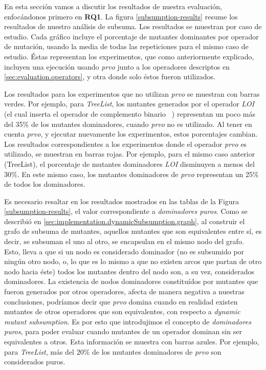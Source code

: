 En esta secci\'on vamos a discutir los resultados de nuestra evaluaci\'on, enfoc\'andonos primero en \textbf{RQ1}. La figura \ref{subsumption-results} resume los resultados de nuestro an\'alisis de subsuma. Los resultados se muestran por caso de estudio. Cada gr\'afico incluye el porcentaje de mutantes dominantes por operador de mutaci\'on, usando la media de todas las repeticiones para el mismo caso de estudio. \'Estas representan los experimentos, que como anteriormente explicado, incluyen una ejecuci\'on usando \emph{prvo} junto a los operadores descriptos en \ref{sec:evaluation.operators}, y otra donde solo \'estos fueron utilizados.

Los resultados para los experimentos que no utilizan \emph{prvo} se muestran con barras verdes. Por ejemplo, para \emph{TreeList}, los mutantes generados por el operador \emph{LOI} (el cual inserta el operador de complemento binario \emph{~}) representan un poco m\'as del 35\% de los mutantes dominadores, cuando \emph{prvo} no es utilizado. Al tener en cuenta \emph{prvo}, y ejecutar nuevamente los experimentos, estos porcentajes cambian. Los resultados correspondientes a los experimentos donde el operador \emph{prvo} es utilizado, se muestran en barras rojas. Por ejemplo, para el mismo caso anterior (TreeList), el porcentaje de mutantes dominadores \emph{LOI} disminuyen a menos del 30\%. En este mismo caso, los mutantes dominadores de \emph{prvo} representan un 25\% de todos los dominadores.

Es necesario resaltar en los resultados mostrados en las tablas de la Figura \ref{subsumption-results}, el valor correspondiente a \emph{dominadores puros}. Como se describi\'o en \ref{sec:implementation.dynamicSubsumption.graph}, al construir el grafo de subsuma de mutantes, aquellos mutantes que son equivalentes entre s\'i, es decir, se subsuman el uno al otro, se encapsulan en el mismo nodo del grafo. Esto, lleva a que si un nodo es considerado dominador (no es subsumido por ning\'un otro nodo, o, lo que es lo mismo a que no existen arcos que partan de otro nodo hacia \'este) todos los mutantes dentro del nodo son, a su vez, considerados dominadores. La existencia de nodos dominadores constitu\'idos por mutantes que fueron generados por otros operadores, afecta de manera negativa a nuestras conclusiones, podr\'iamos decir que \emph{prvo} domina cuando en realidad existen mutantes de otros operadores que son equivalentes, con respecto a \emph{dynamic mutant subsumption}. Es por esto que introdujimos el concepto de \emph{dominadores puros}, para poder evaluar cuando mutantes de un operador dominan sin ser equivalentes a otros. Esta informaci\'on se muestra con barras azules. Por ejemplo, para \emph{TreeList}, m\'as del 20\% de los mutantes dominadores de \emph{prvo} son considerados puros.

